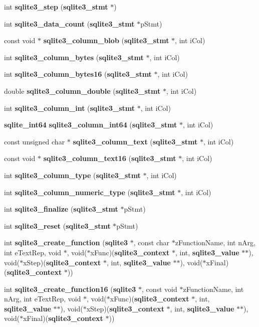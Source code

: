 \begin{DoxyCompactItemize}
\item 
int {\bf sqlite3\_\-step} ({\bf sqlite3\_\-stmt} $\ast$)
\item 
int {\bf sqlite3\_\-data\_\-count} ({\bf sqlite3\_\-stmt} $\ast$pStmt)
\item 
const void $\ast$ {\bf sqlite3\_\-column\_\-blob} ({\bf sqlite3\_\-stmt} $\ast$, int iCol)
\item 
int {\bf sqlite3\_\-column\_\-bytes} ({\bf sqlite3\_\-stmt} $\ast$, int iCol)
\item 
int {\bf sqlite3\_\-column\_\-bytes16} ({\bf sqlite3\_\-stmt} $\ast$, int iCol)
\item 
double {\bf sqlite3\_\-column\_\-double} ({\bf sqlite3\_\-stmt} $\ast$, int iCol)
\item 
int {\bf sqlite3\_\-column\_\-int} ({\bf sqlite3\_\-stmt} $\ast$, int iCol)
\item 
{\bf sqlite\_\-int64} {\bf sqlite3\_\-column\_\-int64} ({\bf sqlite3\_\-stmt} $\ast$, int iCol)
\item 
const unsigned char $\ast$ {\bf sqlite3\_\-column\_\-text} ({\bf sqlite3\_\-stmt} $\ast$, int iCol)
\item 
const void $\ast$ {\bf sqlite3\_\-column\_\-text16} ({\bf sqlite3\_\-stmt} $\ast$, int iCol)
\item 
int {\bf sqlite3\_\-column\_\-type} ({\bf sqlite3\_\-stmt} $\ast$, int iCol)
\item 
int {\bf sqlite3\_\-column\_\-numeric\_\-type} ({\bf sqlite3\_\-stmt} $\ast$, int iCol)
\item 
int {\bf sqlite3\_\-finalize} ({\bf sqlite3\_\-stmt} $\ast$pStmt)
\item 
int {\bf sqlite3\_\-reset} ({\bf sqlite3\_\-stmt} $\ast$pStmt)
\item 
int {\bf sqlite3\_\-create\_\-function} ({\bf sqlite3} $\ast$, const char $\ast$zFunctionName, int nArg, int eTextRep, void $\ast$, void($\ast$xFunc)({\bf sqlite3\_\-context} $\ast$, int, {\bf sqlite3\_\-value} $\ast$$\ast$), void($\ast$xStep)({\bf sqlite3\_\-context} $\ast$, int, {\bf sqlite3\_\-value} $\ast$$\ast$), void($\ast$xFinal)({\bf sqlite3\_\-context} $\ast$))
\item 
int {\bf sqlite3\_\-create\_\-function16} ({\bf sqlite3} $\ast$, const void $\ast$zFunctionName, int nArg, int eTextRep, void $\ast$, void($\ast$xFunc)({\bf sqlite3\_\-context} $\ast$, int, {\bf sqlite3\_\-value} $\ast$$\ast$), void($\ast$xStep)({\bf sqlite3\_\-context} $\ast$, int, {\bf sqlite3\_\-value} $\ast$$\ast$), void($\ast$xFinal)({\bf sqlite3\_\-context} $\ast$))

\end{DoxyCompactItemize}
